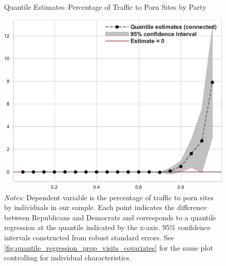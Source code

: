 \documentclass[12pt, letterpaper]{article}
\begin{document}
\begin{figure}
	\centering
	\caption{Quantile Estimates--Percentage of Traffic to Porn Sites by Party}
	\includegraphics[width=.6\linewidth]{../figs/quantile_reg_proportion_visits_adult.pdf}
	\caption*{\footnotesize \emph{Notes:} 
		Dependent variable is the percentage of traffic to porn sites by individuals in our sample.
		Each point indicates the difference between Republicans and Democrats and corresponds to a quantile regression at the quantile indicated by the x-axis.
		95\% confidence intervals constructed from robust standard errors.
		See \cref{fig:quantile_regression_prop_visits_covariates} for the same plot controlling for individual characteristics.
	}
	\label{fig:quantile_regression_prop_visits}
\end{figure}
\end{document}
